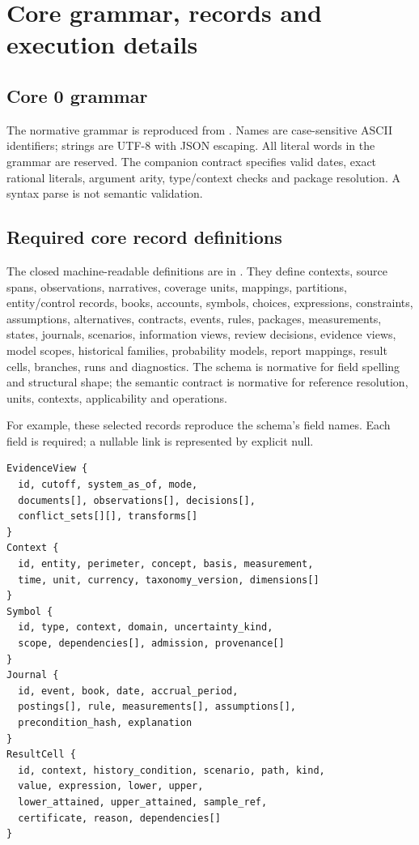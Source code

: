 \chapter{Core grammar, records and execution details}
\label{app:contracts}

\section{Core 0 grammar}

The normative grammar is reproduced from . Names are
case-sensitive ASCII identifiers; strings are UTF-8 with JSON escaping. All
literal words in the grammar are reserved. The companion contract specifies
valid dates, exact rational literals, argument arity, type/context checks and
package resolution. A syntax parse is not semantic validation.



\section{Required core record definitions}

The closed machine-readable definitions are in
. They define contexts, source spans,
observations, narratives, coverage units, mappings, partitions, entity/control
records, books, accounts, symbols, choices, expressions, constraints, assumptions,
alternatives, contracts, events, rules, packages, measurements, states,
journals, scenarios, information views, review decisions, evidence views,
model scopes, historical families, probability models, report mappings,
result cells, branches, runs and diagnostics. The schema is normative for
field spelling and structural shape; the semantic contract is normative for
reference resolution, units, contexts, applicability and operations.

\begin{minipage}{\linewidth}
For example, these selected records reproduce the schema's field names.
Each field is required; a nullable link is represented by explicit null.

\begin{lstlisting}
EvidenceView {
  id, cutoff, system_as_of, mode,
  documents[], observations[], decisions[],
  conflict_sets[][], transforms[]
}
Context {
  id, entity, perimeter, concept, basis, measurement,
  time, unit, currency, taxonomy_version, dimensions[]
}
Symbol {
  id, type, context, domain, uncertainty_kind,
  scope, dependencies[], admission, provenance[]
}
Journal {
  id, event, book, date, accrual_period,
  postings[], rule, measurements[], assumptions[],
  precondition_hash, explanation
}
ResultCell {
  id, context, history_condition, scenario, path, kind,
  value, expression, lower, upper,
  lower_attained, upper_attained, sample_ref,
  certificate, reason, dependencies[]
}
\end{lstlisting}
\end{minipage}

